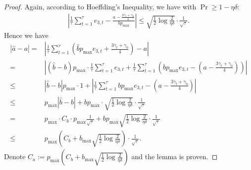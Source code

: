 \begin{proof}
    Again, according to Hoeffding's Inequality, we have with $\Pr\geq 1-\eta\delta$:
    \begin{equation}
        \label{eq:hoeffding_a}
        \begin{aligned}
            |\frac1\tau\sum_{t=1}^\tau e_{3,t} - \frac{a-\frac{3\gamma_t + \gamma_0}4}{bp_{\max}}|\leq\sqrt{\frac12\log\frac2{\eta\delta}}\cdot\frac1{\sqrt{\tau}}.
        \end{aligned}
    \end{equation}
    Hence we have
    \begin{equation}
        \label{eq:error_a}
        \begin{aligned}
            |\hat a - a|=&|\frac1\tau\sum_{t=1}^\tau(\hat b p_{\max}e_{3,t} + \frac{3\gamma_t + \gamma_0}4) - a|\\
            =&|(\hat b - b)p_{\max}\cdot\frac1{\tau}\sum_{t=1}^\tau e_{3,t} + \frac1{\tau}\sum_{t=1}^\tau(b p_{\max}e_{3,t} - (a-\frac{3\gamma_t + \gamma_0}4))|\\
            \leq & |\hat b - b|p_{\max}\cdot 1 + |\frac1{\tau}\sum_{t=1}^\tau bp_{\max}e_{3,t} - (a-\frac{3\gamma_t + \gamma_0}4)|\\
            \leq & p_{\max}|\hat b - b| + bp_{\max}\cdot\sqrt{\frac12\log\frac2{\eta\delta}}\cdot\frac1{\sqrt{\tau}}\\
            =&p_{\max}\cdot C_b\cdot p_{\max}\frac1{\sqrt{\tau}} + bp_{\max}\sqrt{\frac12\log\frac2{\eta\delta}}\cdot\frac1{\sqrt{\tau}}\\
            \leq&p_{\max}(C_b + b_{\max}\sqrt{\frac12\log\frac2{\eta\delta}})\cdot\frac1{\sqrt{\tau}}.
        \end{aligned}
    \end{equation}
    Denote $C_a:=p_{\max}(C_b + b_{\max}\sqrt{\frac12\log\frac2{\eta\delta}})$ and the lemma is proven.
\end{proof}